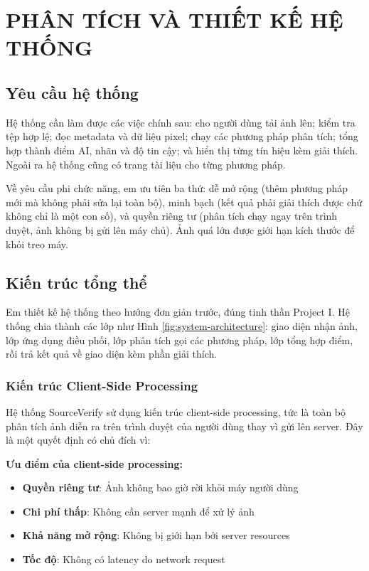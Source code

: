 \documentclass[14pt,a4paper,oneside]{report}
\begin{document}
\clearpage

\chapter{PHÂN TÍCH VÀ THIẾT KẾ HỆ THỐNG}

\section{Yêu cầu hệ thống}
Hệ thống cần làm được các việc chính sau: cho người dùng tải ảnh lên; kiểm tra tệp hợp lệ; đọc metadata và dữ liệu pixel; chạy các phương pháp phân tích; tổng hợp thành điểm AI, nhãn và độ tin cậy; và hiển thị từng tín hiệu kèm giải thích. Ngoài ra hệ thống cũng có trang tài liệu cho từng phương pháp.

Về yêu cầu phi chức năng, em ưu tiên ba thứ: dễ mở rộng (thêm phương pháp mới mà không phải sửa lại toàn bộ), minh bạch (kết quả phải giải thích được chứ không chỉ là một con số), và quyền riêng tư (phân tích chạy ngay trên trình duyệt, ảnh không bị gửi lên máy chủ). Ảnh quá lớn được giới hạn kích thước để khỏi treo máy.

\section{Kiến trúc tổng thể}
Em thiết kế hệ thống theo hướng đơn giản trước, đúng tinh thần Project I. Hệ thống chia thành các lớp như Hình \ref{fig:system-architecture}: giao diện nhận ảnh, lớp ứng dụng điều phối, lớp phân tích gọi các phương pháp, lớp tổng hợp điểm, rồi trả kết quả về giao diện kèm phần giải thích.

\subsection{Kiến trúc Client-Side Processing}
Hệ thống SourceVerify sử dụng kiến trúc client-side processing, tức là toàn bộ phân tích ảnh diễn ra trên trình duyệt của người dùng thay vì gửi lên server. Đây là một quyết định có chủ đích vì:

\textbf{Ưu điểm của client-side processing:}
\begin{itemize}
  \item \textbf{Quyền riêng tư}: Ảnh không bao giờ rời khỏi máy người dùng
  \item \textbf{Chi phí thấp}: Không cần server mạnh để xử lý ảnh
  \item \textbf{Khả năng mở rộng}: Không bị giới hạn bởi server resources
  \item \textbf{Tốc độ}: Không có latency do network request
\end{itemize}
\end{document}
